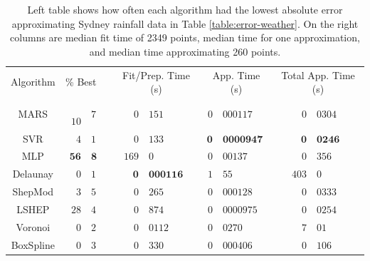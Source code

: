 \documentclass[smallextended,final]{svjour3}  %
\begin{document}
\begin{appendix}
\begin{table}
  \centering
  \begin{tabular}{|c|r@{.}l| c |r@{.}l|r@{.}l|r@{.}l|}
    \cline{1-3}\cline{5-10}
    Algorithm & \multicolumn{2}{c|}{\% Best} &  & \multicolumn{2}{c|}{Fit/Prep. Time (s)} & \multicolumn{2}{c|}{App. Time (s)} & \multicolumn{2}{c|}{Total App. Time (s)}\\
    \cline{1-3}\cline{5-10}
    MARS & \,\,\,\,$10$&$7$ &  & \quad\quad\,\,$0$&$151$ & \quad$0$&$000117$ & \quad\quad\quad\,\,$0$&$0304$\\
    SVR & $4$&$1$ &  & $0$&$133$ & $\mathbf{0}$&$\mathbf{0000947}$ & $\mathbf{0}$&$\mathbf{0246}$\\
    MLP & $\mathbf{56}$&$\mathbf{8}$ &  & $169$&$0$ & $0$&$00137$ & $0$&$356$\\
    Delaunay & $0$&$1$ &  & $\mathbf{0}$&$\mathbf{000116}$ & $1$&$55$ & $403$&$0$\\
    ShepMod & $3$&$5$ &  & $0$&$265$ & $0$&$000128$ & $0$&$0333$\\
    LSHEP & $\mathit{28}$&$\mathit{4}$ &  & $0$&$874$ & $\mathit{0}$&$\mathit{0000975}$ & $\mathit{0}$&$\mathit{0254}$\\
    Voronoi & $0$&$2$ &  & $\mathit{0}$&$\mathit{0112}$ & $0$&$0270$ & $7$&$01$\\
    BoxSpline & $0$&$3$ &  & $0$&$330$ & $0$&$000406$ & $0$&$106$\\
    \cline{1-3}\cline{5-10}
  \end{tabular}
  \caption{Left table shows how often each algorithm had the lowest
    absolute error approximating Sydney rainfall data in Table
    \ref{table:error-weather}. On the right columns are median fit
    time of 2349 points, median time for one approximation, and median
    time approximating 260 points.}
  \label{table:best-weather}
\end{table}



\end{appendix}
\end{document}
